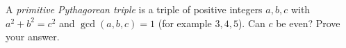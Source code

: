 A \emph{primitive Pythagorean triple} is a triple of positive integers $a,b,c$ with $a^2+b^2=c^2$ and $\gcd(a,b,c)=1$ (for example $3,4,5$). Can $c$ be even? Prove your answer.
